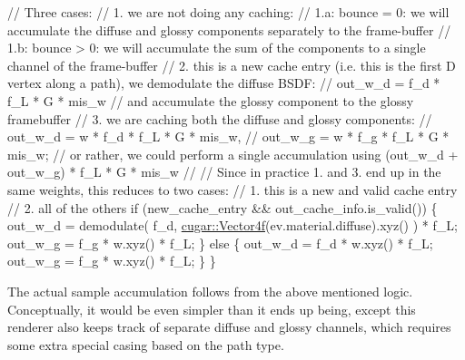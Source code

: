 \begin{DoxyCodeInclude}
        \textcolor{comment}{// Three cases:}
        \textcolor{comment}{//   1. we are not doing any caching:}
        \textcolor{comment}{//      1.a: bounce = 0: we will accumulate the diffuse and glossy components separately to the
       frame-buffer}
        \textcolor{comment}{//      1.b: bounce > 0: we will accumulate the sum of the components to a single channel of the
       frame-buffer}
        \textcolor{comment}{//   2. this is a new cache entry (i.e. this is the first D vertex along a path), we demodulate the
       diffuse BSDF:}
        \textcolor{comment}{//          out\_w\_d = f\_d * f\_L * G * mis\_w}
        \textcolor{comment}{//      and accumulate the glossy component to the glossy framebuffer}
        \textcolor{comment}{//   3. we are caching both the diffuse and glossy components:}
        \textcolor{comment}{//          out\_w\_d = w * f\_d * f\_L * G * mis\_w,}
        \textcolor{comment}{//          out\_w\_g = w * f\_g * f\_L * G * mis\_w;}
        \textcolor{comment}{//      or rather, we could perform a single accumulation using (out\_w\_d + out\_w\_g) * f\_L * G *
       mis\_w}
        \textcolor{comment}{//}
        \textcolor{comment}{// Since in practice 1. and 3. end up in the same weights, this reduces to two cases:}
        \textcolor{comment}{//   1. this is a new and valid cache entry}
        \textcolor{comment}{//   2. all of the others}
        \textcolor{keywordflow}{if} (new\_cache\_entry && out\_cache\_info.is\_valid())
        \{
            out\_w\_d = demodulate( f\_d, \hyperlink{structcugar_1_1_vector}{cugar::Vector4f}(ev.material.diffuse).xyz() ) * f\_L;
            out\_w\_g = f\_g * w.xyz() * f\_L;
        \}
        \textcolor{keywordflow}{else}
        \{
            out\_w\_d = f\_d * w.xyz() * f\_L;
            out\_w\_g = f\_g * w.xyz() * f\_L;
        \}
    \}
\end{DoxyCodeInclude}
 \begin{DoxyParagraph}{}
The actual sample accumulation follows from the above mentioned logic. Conceptually, it would be even simpler than it ends up being, except this renderer also keeps track of separate diffuse and glossy channels, which requires some extra special casing based on the path type.
\end{DoxyParagraph}

